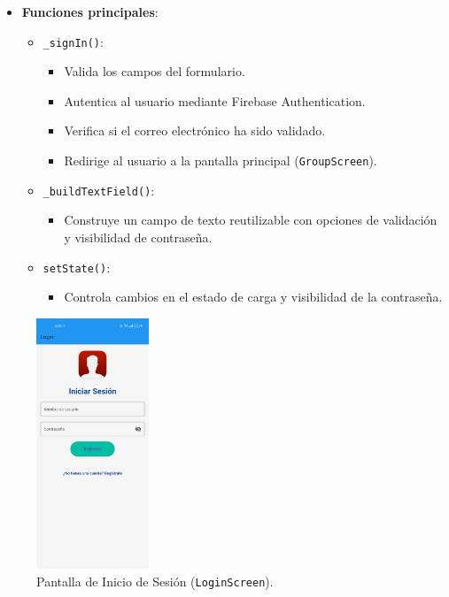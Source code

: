 \documentclass{article}
\begin{document}
\begin{flushleft}
\begin{itemize}
    \item \textbf{Funciones principales}:
    \begin{itemize}
        \item \texttt{\_signIn()}:
        \begin{itemize}
            \item Valida los campos del formulario.
            \item Autentica al usuario mediante Firebase Authentication.
            \item Verifica si el correo electr\'onico ha sido validado.
            \item Redirige al usuario a la pantalla principal (\texttt{GroupScreen}).
        \end{itemize}
        \item \texttt{\_buildTextField()}:
        \begin{itemize}
            \item Construye un campo de texto reutilizable con opciones de validaci\'on y visibilidad de contrase\~na.
        \end{itemize}
        \item \texttt{setState()}:
        \begin{itemize}
            \item Controla cambios en el estado de carga y visibilidad de la contrase\~na.
        \end{itemize}
    \end{itemize}
\end{itemize}

\begin{figure}[H]
    \centering
     \includegraphics[width=0.3\textwidth]{TFG/img/img/login.jpeg}
    \caption{Pantalla de Inicio de Sesi\'on (\texttt{LoginScreen}).}
    \label{fig:login_screen}
\end{figure}


\end{flushleft}
\end{document}
